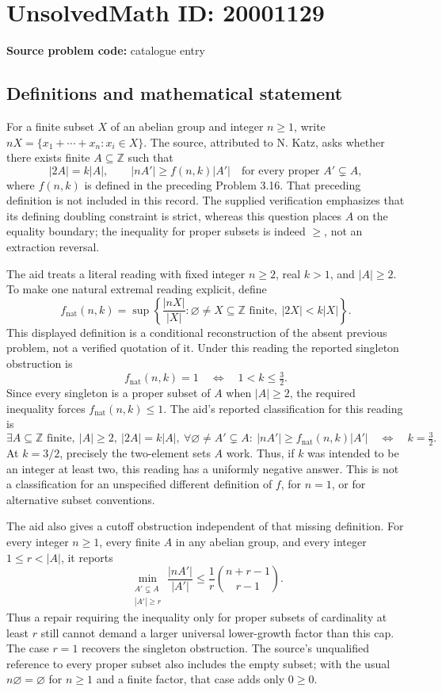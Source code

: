 \documentclass[11pt]{article}
\newcommand{\Z}{\mathbb{Z}}
\begin{document}
\section*{UnsolvedMath ID: 20001129}
\textbf{Source problem code:} catalogue entry
\subsection{Definitions and mathematical statement}
For a finite subset \(X\) of an abelian group and integer \(n\geq1\), write \(nX=\{x_1+\cdots+x_n:x_i\in X\}\). The source, attributed to N. Katz, asks whether there exists finite \(A\subseteq\Z\) such that
\[
 |2A|=k|A|,\qquad
 |nA'|\geq f(n,k)|A'|\quad\text{for every proper }A'\subsetneq A,
\]
where \(f(n,k)\) is defined in the preceding Problem 3.16. That preceding definition is not included in this record. The supplied verification emphasizes that its defining doubling constraint is strict, whereas this question places \(A\) on the equality boundary; the inequality for proper subsets is indeed \(\geq\), not an extraction reversal.

The aid treats a literal reading with fixed integer \(n\geq2\), real \(k>1\), and \(|A|\geq2\). To make one natural extremal reading explicit, define
\[
 f_{\mathrm{nat}}(n,k)=\sup\left\{\frac{|nX|}{|X|}:\varnothing\ne X\subseteq\Z\text{ finite},\ |2X|<k|X|\right\}.
\]
This displayed definition is a conditional reconstruction of the absent previous problem, not a verified quotation of it. Under this reading the reported singleton obstruction is
\[
 f_{\mathrm{nat}}(n,k)=1\quad\Longleftrightarrow\quad1<k\leq\tfrac32.
\]
Since every singleton is a proper subset of \(A\) when \(|A|\geq2\), the required inequality forces \(f_{\mathrm{nat}}(n,k)\leq1\). The aid's reported classification for this reading is
\[
 \exists A\subseteq\Z\text{ finite},\ |A|\geq2,\ |2A|=k|A|,
 \ \forall\varnothing\ne A'\subsetneq A:\ |nA'|\geq f_{\mathrm{nat}}(n,k)|A'|
 \quad\Longleftrightarrow\quad k=\tfrac32.
\]
At \(k=3/2\), precisely the two-element sets \(A\) work. Thus, if \(k\) was intended to be an integer at least two, this reading has a uniformly negative answer. This is not a classification for an unspecified different definition of \(f\), for \(n=1\), or for alternative subset conventions.

The aid also gives a cutoff obstruction independent of that missing definition. For every integer \(n\geq1\), every finite \(A\) in any abelian group, and every integer \(1\leq r<|A|\), it reports
\[
 \min_{\substack{A'\subsetneq A\\|A'|\geq r}}
 \frac{|nA'|}{|A'|}\leq\frac1r\binom{n+r-1}{r-1}.
\]
Thus a repair requiring the inequality only for proper subsets of cardinality at least \(r\) still cannot demand a larger universal lower-growth factor than this cap. The case \(r=1\) recovers the singleton obstruction. The source's unqualified reference to every proper subset also includes the empty subset; with the usual \(n\varnothing=\varnothing\) for \(n\geq1\) and a finite factor, that case adds only \(0\geq0\).
\end{document}
